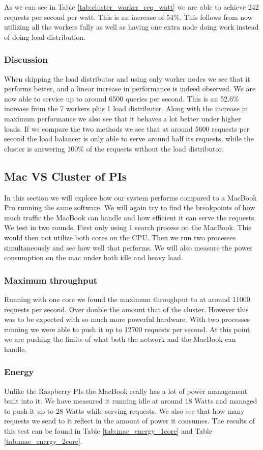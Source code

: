 As we can see in Table \ref{tab:cluster_worker_req_watt} we are able to achieve 242 requests per second per watt.
This is an increase of 54\%.
This follows from now utilizing all the workers fully as well as having one extra node doing work instead of doing load distribution.

\subsubsection{Discussion}
When skipping the load distributor and using only worker nodes we see that it performs better, and a linear increase in performance is indeed observed.
We are now able to service up to around 6500 queries per second. This is an 52.6\% increase from the 7 workers plus 1 load distributer.
Along with the increase in maximum performance we also see that it behaves a lot better under higher loads.
If we compare the two methods we see that at around 5600 requests per second the load balancer is only able to serve around half its requests, while the cluster is answering 100\% of the requests without the load distributor.

\subsection{Mac VS Cluster of PIs}
In this section we will explore how our system performs compared to a MacBook Pro running the same software. We will again try to find the breakpoints of how much traffic the MacBook can handle and how efficient it can serve the requests. We test in two rounds. First only using 1 search process on the MacBook. This would then not utilize both cores on the CPU. Then we run two processes simultaneously and see how well that performs. We will also measure the power consumption on the mac under both idle and heavy load.

\subsubsection{Maximum throughput}
Running with one core we found the maximum throughput to at around 11000 requests per second. Over double the amount that of the cluster.
However this was to be expected with so much more powerful hardware. With two processes running we were able to push it up to 12700 requests per second. At this point we are pushing the limits of what both the network and the MacBook can handle.

\subsubsection{Energy}
Unlike the Raspberry PIs the MacBook really has a lot of power management built into it. We have measured it running idle at around 18 Watts and managed to push it up to 28 Watts while serving requests.
We also see that how many requests we send to it reflect in the amount of power it consumes. The results of this test can be found in Table \ref{tab:mac_energy_1core} and Table \ref{tab:mac_energy_2core}.

